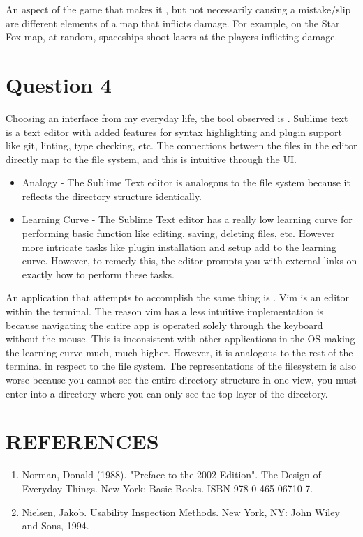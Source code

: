 An aspect of the game that makes it , but not necessarily causing a mistake/slip are different elements of a map that inflicts damage. For example, on the Star Fox map, at random, spaceships shoot lasers at the players inflicting damage.

\section{Question 4}

Choosing an interface from my everyday life, the tool observed is . Sublime text is a text editor with added features for syntax highlighting and plugin support like git, linting, type checking, etc. The connections between the files in the editor directly map to the file system, and this is intuitive through the UI.

\begin{itemize}
\item
  Analogy - The Sublime Text editor is analogous to the file system because it reflects the directory structure identically.
\item
  Learning Curve - The Sublime Text editor has a really low learning curve for performing basic function like editing, saving, deleting files, etc. However more intricate tasks like plugin installation and setup add to the learning curve. However, to remedy this, the editor prompts you with external links on exactly how to perform these tasks.
\end{itemize}

An application that attempts to accomplish the same thing is . Vim is an editor within the terminal. The reason vim has a less intuitive implementation is because navigating the entire app is operated solely through the keyboard without the mouse. This is inconsistent with other applications in the OS making the learning curve much, much higher. However, it is analogous to the rest of the terminal in respect to the file system. The representations of the filesystem is also worse because you cannot see the entire directory structure in one view, you must enter into a directory where you can only see the top layer of the directory.

\section{REFERENCES}

\begin{enumerate}
\item
  Norman, Donald (1988). "Preface to the 2002 Edition". The Design of Everyday Things. New York: Basic Books. ISBN 978-0-465-06710-7.
\item
  Nielsen, Jakob. Usability Inspection Methods. New York, NY: John Wiley and Sons, 1994.
\end{enumerate}

